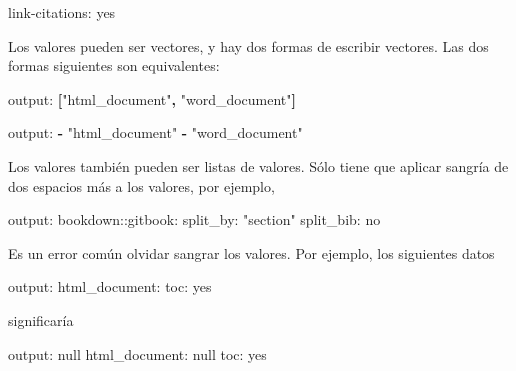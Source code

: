 \documentclass[12pt,]{krantz}
\makeatletter
\newenvironment{Shaded}{\begin{snugshade}}{\end{snugshade}}
\newcommand{\KeywordTok}[1]{\textcolor[rgb]{0.13,0.29,0.53}{\textbf{{#1}}}}
\newcommand{\DataTypeTok}[1]{\textcolor[rgb]{0.13,0.29,0.53}{{#1}}}
\newcommand{\StringTok}[1]{\textcolor[rgb]{0.31,0.60,0.02}{{#1}}}
\newcommand{\FunctionTok}[1]{\textcolor[rgb]{0.00,0.00,0.00}{{#1}}}
\newcommand{\NormalTok}[1]{{#1}}
\newenvironment{kframe}{%
\medskip{}
\setlength{\fboxsep}{.8em}
 \def\at@end@of@kframe{}%
 \ifinner\ifhmode%
  \def\at@end@of@kframe{\end{minipage}}%
  \begin{minipage}{\columnwidth}%
 \fi\fi%
 \def\FrameCommand##1{\hskip\@totalleftmargin \hskip-\fboxsep
 \colorbox{shadecolor}{##1}\hskip-\fboxsep
     \hskip-\linewidth \hskip-\@totalleftmargin \hskip\columnwidth}%
 \MakeFramed {\advance\hsize-\width
   \@totalleftmargin\z@ \linewidth\hsize
   \@setminipage}}%
 {\par\unskip\endMakeFramed%
 \at@end@of@kframe}
\renewenvironment{Shaded}{\begin{kframe}}{\end{kframe}}
\theoremstyle{definition}
\theoremstyle{definition}
\theoremstyle{remark}
\makeatother
\begin{document}
\begin{Shaded}
\begin{Highlighting}[]
\FunctionTok{link-citations:} \NormalTok{yes}
\end{Highlighting}
\end{Shaded}

Los valores pueden ser vectores, y hay dos formas de escribir vectores.
Las dos formas siguientes son equivalentes:

\begin{Shaded}
\begin{Highlighting}[]
\FunctionTok{output:} \KeywordTok{[}\StringTok{"html_document"}\KeywordTok{,} \StringTok{"word_document"}\KeywordTok{]}
\end{Highlighting}
\end{Shaded}

\begin{Shaded}
\begin{Highlighting}[]
\FunctionTok{output:}
  \KeywordTok{-} \StringTok{"html_document"}
  \KeywordTok{-} \StringTok{"word_document"}
\end{Highlighting}
\end{Shaded}

Los valores también pueden ser listas de valores. Sólo tiene que aplicar
sangría de dos espacios más a los valores, por ejemplo,

\begin{Shaded}
\begin{Highlighting}[]
\FunctionTok{output:}
  \FunctionTok{bookdown:}\NormalTok{:gitbook:}
    \FunctionTok{split_by:} \StringTok{"section"}
    \FunctionTok{split_bib:} \NormalTok{no}
\end{Highlighting}
\end{Shaded}

Es un error común olvidar sangrar los valores. Por ejemplo, los
siguientes datos

\begin{Shaded}
\begin{Highlighting}[]
\FunctionTok{output:}
\FunctionTok{html_document:}
\FunctionTok{toc:} \NormalTok{yes}
\end{Highlighting}
\end{Shaded}

significaría

\begin{Shaded}
\begin{Highlighting}[]
\FunctionTok{output:} \DataTypeTok{null}
\FunctionTok{html_document:} \DataTypeTok{null}
\FunctionTok{toc:} \NormalTok{yes}
\end{Highlighting}
\end{Shaded}
\end{document}
